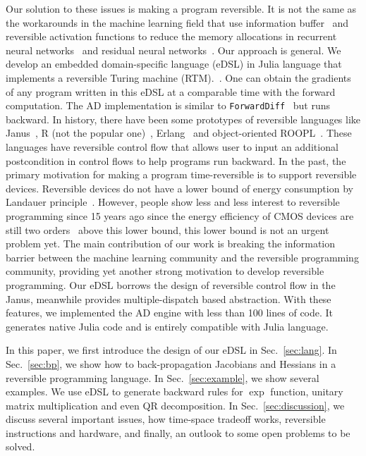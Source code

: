 \documentclass[aps,twocolumn,longbibliography,english,superscriptaddress]{revtex4-1}
\newcommand{\<}{\langle}
\renewcommand{\>}{\rangle}
\newcommand{\Sec}[1]{Sec.~\ref{#1}}
\theoremstyle{definition}\newtheorem{definition}{\textit{Definition}}
\begin{document}

Our solution to these issues is making a program reversible. It is not the same as the workarounds in the machine learning field that use information buffer~\cite{Maclaurin2015} and reversible activation functions to reduce the memory allocations in recurrent neural networks~\cite{MacKay2018} and residual neural networks~\cite{Behrmann2018}. Our approach is general. We develop an embedded domain-specific language (eDSL) in Julia language that implements a reversible Turing machine (RTM).~\cite{Perumalla2013,Frank2017}.
One can obtain the gradients of any program written in this eDSL at a comparable time with the forward computation. The AD implementation is similar to \texttt{ForwardDiff}~\cite{Revels2016} but runs backward.
    In history, there have been some prototypes of reversible languages like Janus~\cite{Lutz1986}, R (not the popular one)~\cite{Frank1997}, Erlang~\cite{Lanese2018} and object-oriented ROOPL~\cite{Haulund2017}. These languages have reversible control flow that allows user to input an additional postcondition in control flows to help programs run backward.
    In the past, the primary motivation for making a program time-reversible is to support reversible devices. Reversible devices do not have a lower bound of energy consumption by Landauer principle~\cite{Landauer1961}. However, people show less and less interest to reversible programming since 15 years ago since the energy efficiency of CMOS devices are still two orders~\cite{Frank2017} above this lower bound, this lower bound is not an urgent problem yet.
    The main contribution of our work is breaking the information barrier between the machine learning community and the reversible programming community, providing yet another strong motivation to develop reversible programming.
    Our eDSL borrows the design of reversible control flow in the Janus, meanwhile provides multiple-dispatch based abstraction. With these features, we implemented the AD engine with less than 100 lines of code. It generates native Julia code and is entirely compatible with Julia language.

    In this paper, we first introduce the design of our eDSL in \Sec{sec:lang}.
    In \Sec{sec:bp}, we show how to back-propagation Jacobians and Hessians in a reversible programming language.
    In \Sec{sec:example}, we show several examples. We use eDSL to generate backward rules for $\exp$ function, unitary matrix multiplication and even QR decomposition.
    In \Sec{sec:discussion}, we discuss several important issues, how time-space tradeoff works, reversible instructions and hardware, and finally, an outlook to some open problems to be solved.
\end{document}
